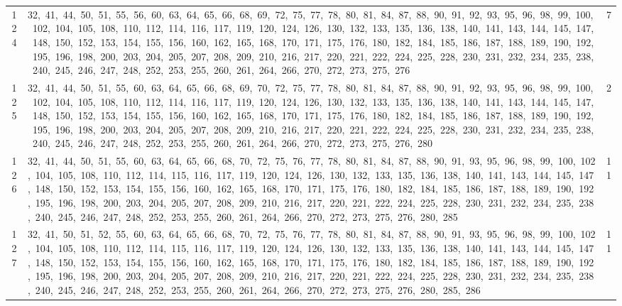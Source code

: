 \begin{longtable}{c|p{}|r}
124 & 32,\ 41,\ 44,\ 50,\ 51,\ 55,\ 56,\ 60,\ 63,\ 64,\ 65,\ 66,\ 68,\ 69,\ 72,\ 75,\ 77,\ 78,\ 80,\ 81,\ 84,\ 87,\ 88,\ 90,\ 91,\ 92,\ 93,\ 95,\ 96,\ 98,\ 99,\ 100,\ 102,\ 104,\ 105,\ 108,\ 110,\ 112,\ 114,\ 116,\ 117,\ 119,\ 120,\ 124,\ 126,\ 130,\ 132,\ 133,\ 135,\ 136,\ 138,\ 140,\ 141,\ 143,\ 144,\ 145,\ 147,\ 148,\ 150,\ 152,\ 153,\ 154,\ 155,\ 156,\ 160,\ 162,\ 165,\ 168,\ 170,\ 171,\ 175,\ 176,\ 180,\ 182,\ 184,\ 185,\ 186,\ 187,\ 188,\ 189,\ 190,\ 192,\ 195,\ 196,\ 198,\ 200,\ 203,\ 204,\ 205,\ 207,\ 208,\ 209,\ 210,\ 216,\ 217,\ 220,\ 221,\ 222,\ 224,\ 225,\ 228,\ 230,\ 231,\ 232,\ 234,\ 235,\ 238,\ 240,\ 245,\ 246,\ 247,\ 248,\ 252,\ 253,\ 255,\ 260,\ 261,\ 264,\ 266,\ 270,\ 272,\ 273,\ 275,\ 276 & 7 \\
125 & 32,\ 41,\ 44,\ 50,\ 51,\ 55,\ 60,\ 63,\ 64,\ 65,\ 66,\ 68,\ 69,\ 70,\ 72,\ 75,\ 77,\ 78,\ 80,\ 81,\ 84,\ 87,\ 88,\ 90,\ 91,\ 92,\ 93,\ 95,\ 96,\ 98,\ 99,\ 100,\ 102,\ 104,\ 105,\ 108,\ 110,\ 112,\ 114,\ 116,\ 117,\ 119,\ 120,\ 124,\ 126,\ 130,\ 132,\ 133,\ 135,\ 136,\ 138,\ 140,\ 141,\ 143,\ 144,\ 145,\ 147,\ 148,\ 150,\ 152,\ 153,\ 154,\ 155,\ 156,\ 160,\ 162,\ 165,\ 168,\ 170,\ 171,\ 175,\ 176,\ 180,\ 182,\ 184,\ 185,\ 186,\ 187,\ 188,\ 189,\ 190,\ 192,\ 195,\ 196,\ 198,\ 200,\ 203,\ 204,\ 205,\ 207,\ 208,\ 209,\ 210,\ 216,\ 217,\ 220,\ 221,\ 222,\ 224,\ 225,\ 228,\ 230,\ 231,\ 232,\ 234,\ 235,\ 238,\ 240,\ 245,\ 246,\ 247,\ 248,\ 252,\ 253,\ 255,\ 260,\ 261,\ 264,\ 266,\ 270,\ 272,\ 273,\ 275,\ 276,\ 280 & 2 \\
126 & 32,\ 41,\ 44,\ 50,\ 51,\ 55,\ 60,\ 63,\ 64,\ 65,\ 66,\ 68,\ 70,\ 72,\ 75,\ 76,\ 77,\ 78,\ 80,\ 81,\ 84,\ 87,\ 88,\ 90,\ 91,\ 93,\ 95,\ 96,\ 98,\ 99,\ 100,\ 102,\ 104,\ 105,\ 108,\ 110,\ 112,\ 114,\ 115,\ 116,\ 117,\ 119,\ 120,\ 124,\ 126,\ 130,\ 132,\ 133,\ 135,\ 136,\ 138,\ 140,\ 141,\ 143,\ 144,\ 145,\ 147,\ 148,\ 150,\ 152,\ 153,\ 154,\ 155,\ 156,\ 160,\ 162,\ 165,\ 168,\ 170,\ 171,\ 175,\ 176,\ 180,\ 182,\ 184,\ 185,\ 186,\ 187,\ 188,\ 189,\ 190,\ 192,\ 195,\ 196,\ 198,\ 200,\ 203,\ 204,\ 205,\ 207,\ 208,\ 209,\ 210,\ 216,\ 217,\ 220,\ 221,\ 222,\ 224,\ 225,\ 228,\ 230,\ 231,\ 232,\ 234,\ 235,\ 238,\ 240,\ 245,\ 246,\ 247,\ 248,\ 252,\ 253,\ 255,\ 260,\ 261,\ 264,\ 266,\ 270,\ 272,\ 273,\ 275,\ 276,\ 280,\ 285 & 11 \\
127 & 32,\ 41,\ 50,\ 51,\ 52,\ 55,\ 60,\ 63,\ 64,\ 65,\ 66,\ 68,\ 70,\ 72,\ 75,\ 76,\ 77,\ 78,\ 80,\ 81,\ 84,\ 87,\ 88,\ 90,\ 91,\ 93,\ 95,\ 96,\ 98,\ 99,\ 100,\ 102,\ 104,\ 105,\ 108,\ 110,\ 112,\ 114,\ 115,\ 116,\ 117,\ 119,\ 120,\ 124,\ 126,\ 130,\ 132,\ 133,\ 135,\ 136,\ 138,\ 140,\ 141,\ 143,\ 144,\ 145,\ 147,\ 148,\ 150,\ 152,\ 153,\ 154,\ 155,\ 156,\ 160,\ 162,\ 165,\ 168,\ 170,\ 171,\ 175,\ 176,\ 180,\ 182,\ 184,\ 185,\ 186,\ 187,\ 188,\ 189,\ 190,\ 192,\ 195,\ 196,\ 198,\ 200,\ 203,\ 204,\ 205,\ 207,\ 208,\ 209,\ 210,\ 216,\ 217,\ 220,\ 221,\ 222,\ 224,\ 225,\ 228,\ 230,\ 231,\ 232,\ 234,\ 235,\ 238,\ 240,\ 245,\ 246,\ 247,\ 248,\ 252,\ 253,\ 255,\ 260,\ 261,\ 264,\ 266,\ 270,\ 272,\ 273,\ 275,\ 276,\ 280,\ 285,\ 286 & 11 \\

\end{longtable}

